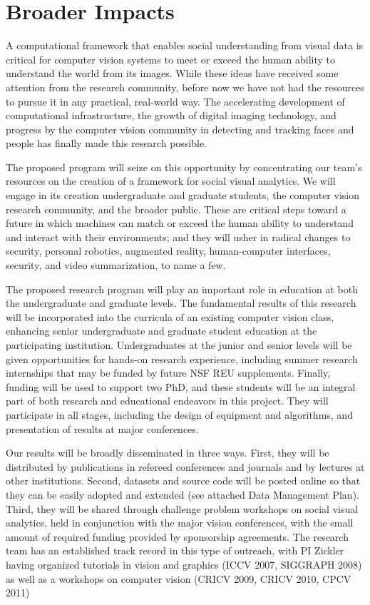 
\section{Broader Impacts}
\label{sec:impacts}

A computational framework that enables social understanding from visual data is critical for computer vision systems to meet or exceed the human ability to understand the world from its images. While these ideas have received some attention from the research community, before now we have not had the resources to pursue it in any practical, real-world way. The accelerating development of computational infrastructure, the growth of digital imaging technology, and progress by the computer vision community in detecting and tracking faces and people has finally made this research possible. 

The proposed  program will seize on this opportunity by concentrating our team's resources on the creation of a  framework for social visual analytics.  We will engage in its creation undergraduate and graduate students, the computer vision research community, and the broader public. These are critical steps toward a future in which machines can match or exceed the human ability to understand and interact with their environments; and they will usher in radical changes to security, personal robotics, augmented reality, human-computer interfaces, security, and video summarization, to name a few.

The proposed research program will play an important role in education at
both the undergraduate and graduate levels. The fundamental results of this
research will be incorporated into the curricula of an existing computer vision class, enhancing senior
undergraduate and graduate student education at the participating
institution. Undergraduates at the junior and senior levels will be given
opportunities for hands-on research experience, including summer research
internships that may be funded by future NSF REU supplements. Finally, funding
will be used to support two PhD, and these
students will be an integral part of both research and educational endeavors in
this project. They will participate in all stages, including the design of
equipment and algorithms, and presentation of results at major conferences.

Our results will be broadly disseminated in three ways. First, they
will be distributed by publications in refereed conferences and
journals and by lectures at other institutions.  Second, datasets and source
code will be posted online so that they can be
easily adopted and extended (see attached Data Management Plan). Third, they will be shared through  challenge problem workshops on social visual analytics, held in conjunction with the major  vision conferences, with the small amount of required funding provided by sponsorship agreements. The research team has an established track record in this type of outreach, with PI Zickler having organized tutorials in  vision and  graphics (ICCV 2007, SIGGRAPH 2008) as well as a workshops on computer vision (CRICV 2009, CRICV 2010, CPCV 2011)
